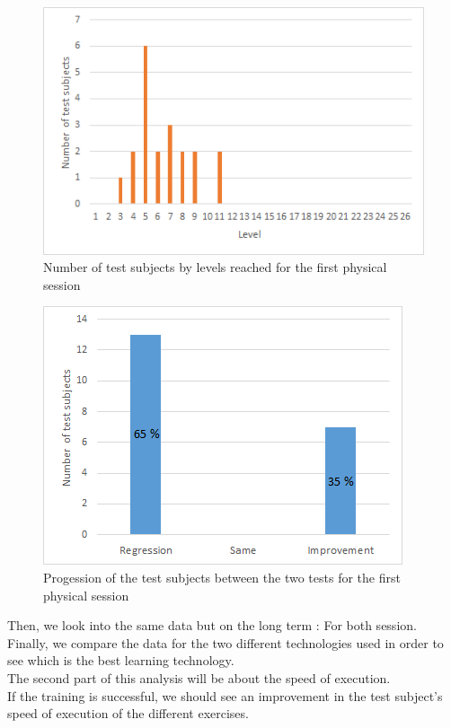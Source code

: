 \documentclass[12pt, openany, twocolumn]{article}
\begin{document}
        \begin{figure}
            \includegraphics[scale=0.74]{graphics/bargraph-p-nbtestsujbectperlevel.png}
            \caption{Number of test subjects by levels reached for the first physical session}
        \end{figure}
        
        \begin{figure}
            \includegraphics[scale=0.74]{graphics/rsi-p.png}
            \caption{Progession of the test subjects between the two tests for the first physical session}
        \end{figure}
    
        

    Then, we look into the same data but on the long term : For both session. \\
    Finally, we compare the data for the two different technologies used in order to see which is the best learning technology. \\

    The second part of this analysis will be about the speed of execution. \\
    If the training is successful, we should see an improvement in the test subject's speed of execution of the different exercises.
    \\
\end{document}
